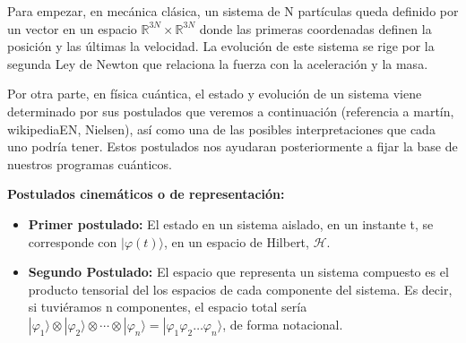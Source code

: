 \vspace{5pt}

Para empezar, en mecánica clásica, un sistema de N partículas queda definido por un vector en un espacio $\mathbb{R}^{3N} \times \mathbb{R}^{3N}$ donde las primeras coordenadas definen la posición y las últimas la velocidad. La evolución de este sistema se rige por la segunda Ley de Newton que relaciona la fuerza con la aceleración y la masa.

\vspace{5pt}

Por otra parte, en física cuántica, el estado y evolución de un sistema viene determinado por sus postulados que veremos a continuación (referencia a martín, wikipediaEN, Nielsen), así como una de las posibles interpretaciones que cada uno podría tener. Estos postulados nos ayudaran posteriormente a fijar la base de nuestros programas cuánticos.
\vspace{10pt}

\textbf{Postulados cinemáticos o de representación:}
\begin{itemize}
    \item \textbf{Primer postulado:} El estado en un sistema aislado, en un instante t, se corresponde con $| \varphi (t) \rangle$, en un espacio de Hilbert, $\mathscr{H}$.
    
    \item \textbf{Segundo Postulado:} El espacio que representa un sistema compuesto es el producto tensorial del los espacios de cada componente del sistema. Es decir, si tuviéramos n componentes, el espacio total sería $|\varphi_{1}\rangle \otimes |\varphi_{2}\rangle \otimes \dotsi \otimes |\varphi_{n}\rangle = |\varphi_{1}\varphi_{2}\dotso \varphi_{n}\rangle$, de forma notacional.
\end{itemize}

